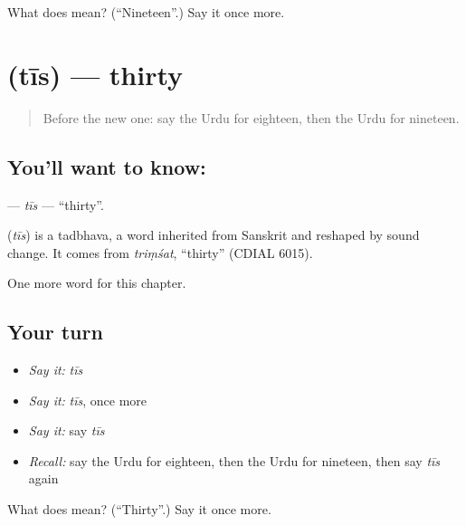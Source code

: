 \begin{tcolorbox}[breakable,colback=teal!4,colframe=teal!35!black,title={Before you move on}]
What does  mean? (\textquotedblleft{}Nineteen\textquotedblright{}.) Say it once more.
\end{tcolorbox}
\section[\texorpdfstring{\ur{تیس} (tīs)}{تیس (tīs)}]{ (tīs) — thirty}

\label{lesson:UR-C85-tis}



\begin{quote}
Before the new one: say the Urdu for eighteen, then the Urdu for nineteen.
\end{quote}

\subsection*{You'll want to know: }
\textbf{} — \emph{tīs} — \textquotedblleft{}thirty\textquotedblright{}.

\begin{cousinweb}
\textbf{} (\emph{tīs}) is a tadbhava, a word inherited from Sanskrit and reshaped by sound change. It comes from \emph{triṃśat}, \textquotedblleft{}thirty\textquotedblright{} (CDIAL 6015).
\end{cousinweb}

\begin{grammarlens}[title={What you've built}]
One more word for this chapter.
\end{grammarlens}

\subsection*{Your turn}
\begin{itemize}
\raggedright
  \item \emph{Say it:} \emph{tīs}
  \item \emph{Say it:} \emph{tīs}, once more
  \item \emph{Say it:} say \emph{tīs}
  \item \emph{Recall:} say the Urdu for eighteen, then the Urdu for nineteen, then say \emph{tīs} again
\end{itemize}

\begin{tcolorbox}[breakable,colback=teal!4,colframe=teal!35!black,title={Before you move on}]
What does  mean? (\textquotedblleft{}Thirty\textquotedblright{}.) Say it once more.
\end{tcolorbox}

